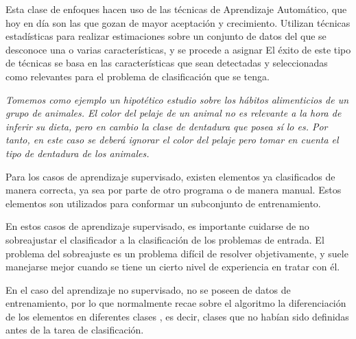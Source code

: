 Esta clase de enfoques hacen uso de las técnicas de Aprendizaje Automático, que hoy en día son las que gozan de mayor aceptación y crecimiento.
%
Utilizan técnicas estadísticas para realizar estimaciones sobre un conjunto de datos del que se desconoce una o varias características, y se procede a asignar
%
El éxito de este tipo de técnicas se basa en las características que sean detectadas y seleccionadas como relevantes para el problema de clasificación que se tenga.

\begin{minipage}{\linewidth}
\textit{Tomemos como ejemplo un hipotético estudio sobre los hábitos alimenticios de un grupo de animales.
El color del pelaje de un animal no es relevante a la hora de inferir su dieta, pero en cambio la clase de dentadura que posea sí lo es. Por tanto, en este caso se deberá ignorar el color del pelaje pero tomar en cuenta el tipo de dentadura de los animales.}
\end{minipage}


Para los casos de aprendizaje supervisado, existen elementos ya clasificados de manera correcta, ya sea por parte de otro programa o de manera manual. Estos elementos son utilizados para conformar un subconjunto de entrenamiento.

En estos casos de aprendizaje supervisado, es importante cuidarse de no sobreajustar el clasificador a la clasificación de los problemas de entrada. 
%
El problema del sobreajuste es un problema difícil de resolver objetivamente, y suele manejarse mejor cuando se tiene un cierto nivel de experiencia en tratar con él.

En el caso del aprendizaje no supervisado, no se poseen de datos de entrenamiento, por lo que normalmente recae sobre el algoritmo la diferenciación de los elementos en diferentes clases , es decir, clases que no habían sido definidas antes de la tarea de clasificación.



